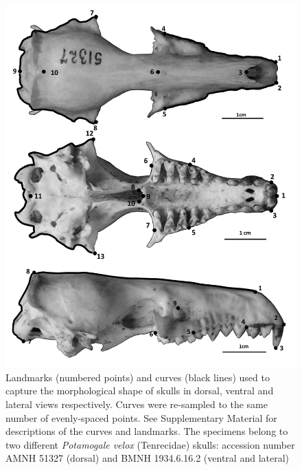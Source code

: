 \documentclass[12pt,a4paper]{article}
\begin{document}
	\begin{figure}
	\centering
	\includegraphics[width=1\linewidth]{figures/skdors+skvent+sklat_BW.png}
	
	\caption[Diagram of the landmarks and curves for the skulls in dorsal ventral and lateral views]
		{Landmarks (numbered points) and curves (black lines) used to capture the morphological shape of skulls in dorsal, ventral and lateral views respectively. Curves were re-sampled to the same number of evenly-spaced points. See Supplementary Material for descriptions of the curves and landmarks. The specimens belong to two different \textit{Potamogale velox} (Tenrecidae) skulls: accession number AMNH 51327 (dorsal) and BMNH 1934.6.16.2 (ventral and lateral)}
	
	\label{fig:skulls_landmarks}
	\end{figure}


\end{document}
